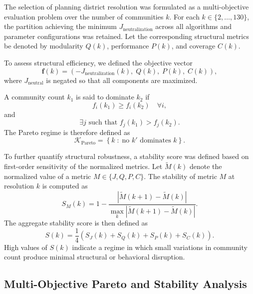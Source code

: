 \documentclass[conference]{IEEEtran}
\begin{document}
The selection of planning district resolution was formulated as a
multi-objective evaluation problem over the number of communities $k$.
For each $k \in \{2, \dots, 130\}$, the partition achieving the minimum
$J_{\mathrm{neutralization}}$ across all algorithms and parameter
configurations was retained. Let the corresponding structural metrics be
denoted by modularity $Q(k)$, performance $P(k)$, and coverage $C(k)$.

To assess structural efficiency, we defined the objective vector
\begin{equation}
\mathbf{f}(k) =
\left(
- J_{\mathrm{neutralization}}(k),
\; Q(k),
\; P(k),
\; C(k)
\right),
\end{equation}
where $J_{\mathrm{neutral}}$ is negated so that all components
are maximized.

A community count $k_1$ is said to dominate $k_2$ if
\begin{equation}
f_i(k_1) \ge f_i(k_2) \quad \forall i,
\end{equation}
and
\begin{equation}
\exists j \text{ such that } f_j(k_1) > f_j(k_2).
\end{equation}
The Pareto regime is therefore defined as
\begin{equation}
\mathcal{K}_{\mathrm{Pareto}}
=
\left\{
k \;:\;
\text{no } k' \text{ dominates } k
\right\}.
\end{equation}

To further quantify structural robustness, a stability score was defined
based on first-order sensitivity of the normalized metrics. Let
$\tilde{M}(k)$ denote the normalized value of a metric $M \in
\{J,Q,P,C\}$. The stability of metric $M$ at resolution $k$ is computed as
\begin{equation}
S_M(k)
=
1 -
\frac{|\tilde{M}(k+1) - \tilde{M}(k)|}
{\max_{k} |\tilde{M}(k+1) - \tilde{M}(k)|}.
\end{equation}
The aggregate stability score is then defined as
\begin{equation}
S(k)
=
\frac{1}{4}
\left(
S_J(k) + S_Q(k) + S_P(k) + S_C(k)
\right).
\end{equation}
High values of $S(k)$ indicate a regime in which small variations in
community count produce minimal structural or behavioral disruption.

\subsection{Multi-Objective Pareto and Stability Analysis}
\end{document}
